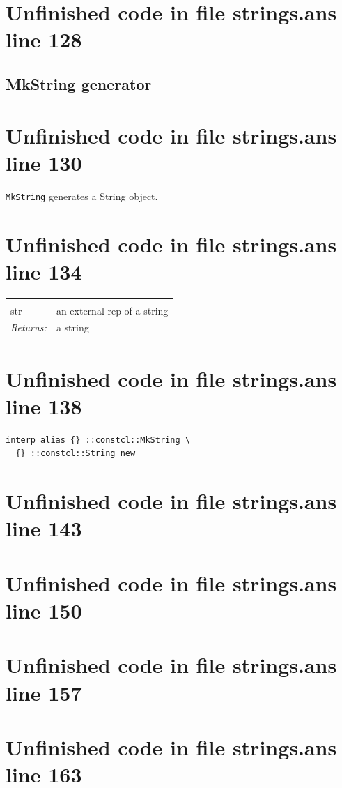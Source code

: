 \documentclass[twoside,9pt]{report}
\begin{document}
\section{Unfinished code in file strings.ans line 128}
\subsection{MkString generator}
\label{mkstring-generator}
\section{Unfinished code in file strings.ans line 130}


\texttt{MkString} generates a String object.

\section{Unfinished code in file strings.ans line 134}
\noindent\begin{tabular}{ |p{1.9cm} p{8cm}| }
\hline
\rowcolor[HTML]{CCCCCC} \multicolumn{2}{|l|}{\bf MkString (internal)} \\
str & an external rep of a string \\
\textit{Returns:} & a string \\
\hline
\end{tabular}
\section{Unfinished code in file strings.ans line 138}
\begin{lstlisting}
interp alias {} ::constcl::MkString \
  {} ::constcl::String new
\end{lstlisting}
\section{Unfinished code in file strings.ans line 143}
\section{Unfinished code in file strings.ans line 150}
\section{Unfinished code in file strings.ans line 157}
\section{Unfinished code in file strings.ans line 163}
\end{document}
